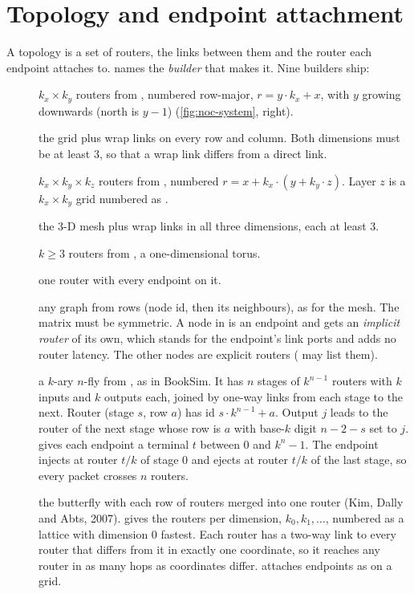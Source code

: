 \section{Topology and endpoint attachment}\label{sec:noc-topology}

A topology is a set of routers, the links between them and the router each endpoint attaches to.
 names the \emph{builder} that makes it. Nine builders ship:

\begin{description}
\item[] $k_x \times k_y$ routers from , numbered row-major,
  $r = y\cdot k_x + x$, with $y$ growing downwards (north is $y-1$)
  (\cref{fig:noc-system}, right).
\item[] the grid plus wrap links on every row and column. Both dimensions must be
  at least 3, so that a wrap link differs from a direct link.
\item[] $k_x \times k_y \times k_z$ routers from , numbered
  $r = x + k_x\cdot(y + k_y\cdot z)$. Layer $z$ is a $k_x \times k_y$ grid numbered as
  .
\item[] the 3-D mesh plus wrap links in all three dimensions, each at least 3.
\item[] $k \ge 3$ routers from , a one-dimensional torus.
\item[] one router with every endpoint on it.
\item[] any graph from  rows (node id, then its
  neighbours), as for the mesh. The matrix must be symmetric. A node in  is an
  endpoint and gets an \emph{implicit router} of its own, which stands for the endpoint's link
  ports and adds no router latency. The other nodes are explicit routers ( may
  list them).
\item[] a $k$-ary $n$-fly from , as in BookSim. It has $n$
  stages of $k^{n-1}$ routers with $k$ inputs and $k$ outputs each, joined by one-way links from
  each stage to the next. Router (stage $s$, row $a$) has id $s\cdot k^{n-1} + a$. Output $j$
  leads to the router of the next stage whose row is $a$ with base-$k$ digit $n-2-s$ set to $j$.
   gives each endpoint a terminal $t$ between 0 and $k^n-1$. The endpoint
  injects at router $t/k$ of stage 0 and ejects at router $t/k$ of the last stage, so every packet
  crosses $n$ routers.
\item[] the butterfly with each row of routers merged into one router
  (Kim, Dally and Abts, 2007).  gives the routers per dimension,
  $k_0,k_1,\dots$, numbered as a lattice with dimension 0 fastest. Each router has a two-way
  link to every router that differs from it in exactly one coordinate, so it reaches any router
  in as many hops as coordinates differ.  attaches endpoints as on a grid.
\end{description}

